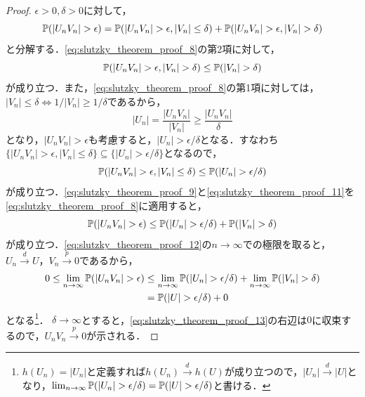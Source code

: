 \documentclass[main.tex]{subfiles}
\begin{document}
\begin{proof}
$\epsilon>0, \delta > 0$に対して，
\begin{equation}
  \mathbb{P}(|U_n V_n| > \epsilon) = \mathbb{P}(|U_n V_n| > \epsilon, |V_n| \leq \delta) + \mathbb{P}(|U_n V_n| > \epsilon, |V_n| > \delta)
  \label{eq:slutzky_theorem_proof_8}
\end{equation}
と分解する．\eqref{eq:slutzky_theorem_proof_8}の第2項に対して，
\begin{equation}
  \mathbb{P}(|U_n V_n| > \epsilon, |V_n| > \delta) \leq \mathbb{P}(|V_n| > \delta)
  \label{eq:slutzky_theorem_proof_9}
\end{equation}
が成り立つ．また，\eqref{eq:slutzky_theorem_proof_8}の第1項に対しては，$|V_n| \leq \delta \Leftrightarrow 1/|V_n| \geq 1/\delta$であるから，
\begin{equation}
  |U_n | = \frac{|U_n V_n|}{|V_n|} \geq \frac{|U_n V_n|}{\delta} 
\label{eq:slutzky_theorem_proof_10}
\end{equation}
となり，$|U_n V_n| > \epsilon$も考慮すると，$|U_n| > \epsilon / \delta$となる．すなわち$\{ |U_n V_n| > \epsilon, |V_n| \leq \delta \} \subseteq \{ |U_n| > \epsilon / \delta \}$となるので，
\begin{equation}
  \mathbb{P}(|U_n V_n| > \epsilon, |V_n| \leq \delta) \leq \mathbb{P}(|U_n| > \epsilon / \delta)
  \label{eq:slutzky_theorem_proof_11}
\end{equation}
が成り立つ．\eqref{eq:slutzky_theorem_proof_9}と\eqref{eq:slutzky_theorem_proof_11}を\eqref{eq:slutzky_theorem_proof_8}に適用すると，
\begin{equation}
  \mathbb{P}(|U_n V_n| > \epsilon) \leq \mathbb{P}(|U_n| > \epsilon / \delta) + \mathbb{P}(|V_n| > \delta)
  \label{eq:slutzky_theorem_proof_12}
\end{equation}
が成り立つ．\eqref{eq:slutzky_theorem_proof_12}の$n \to \infty$での極限を取ると，$U_n \xrightarrow{d} U$，$V_n \xrightarrow{p} 0$であるから，
\begin{align}
  0 \leq \lim_{n \to \infty} \mathbb{P}(|U_n V_n| > \epsilon) &\leq \lim_{n \to \infty} \mathbb{P}(|U_n| > \epsilon / \delta) + \lim_{n \to \infty} \mathbb{P}(|V_n| > \delta) \notag \\
  &= \mathbb{P}(|U| > \epsilon / \delta) + 0
  \label{eq:slutzky_theorem_proof_13}
\end{align}
となる\footnote{$h(U_n) = |U_n|$と定義すれば$h(U_n) \xrightarrow{d} h(U)$が成り立つので，$|U_n| \xrightarrow{d} |U|$となり，$\lim_{n \to \infty} \mathbb{P}(|U_n| > \epsilon / \delta) = \mathbb{P}(|U| > \epsilon / \delta)$と書ける．}．
$\delta \to \infty$とすると，\eqref{eq:slutzky_theorem_proof_13}の右辺は$0$に収束するので，$U_n V_n \xrightarrow{p} 0$が示される．
\end{proof}
\end{document}
